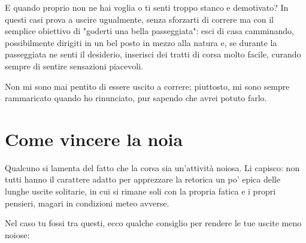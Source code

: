 E quando proprio non ne hai voglia o ti senti troppo stanco e demotivato?
In questi casi prova a uscire ugualmente,
senza sforzarti di correre
ma con il semplice obiettivo di "goderti una bella passeggiata":
esci di casa camminando, possibilmente dirigiti in un bel posto
in mezzo alla natura e, se durante la passeggiata ne senti il desiderio,
inserisci dei tratti di corsa molto facile,
curando sempre di sentire sensazioni piacevoli.

Non mi sono mai pentito di essere uscito a correre;
piuttosto, mi sono sempre rammaricato quando ho rinunciato,
pur sapendo che avrei potuto farlo.

\chapter{Come vincere la noia}

Qualcuno si lamenta del fatto che la corsa sia un'attività noiosa.
Li capisco: non tutti hanno il carattere adatto per apprezzare la
retorica un po' epica delle lunghe uscite solitarie, in cui si rimane
soli con la propria fatica e i propri pensieri,
magari in condizioni meteo avverse.

Nel caso tu fossi tra questi, ecco qualche consiglio
per rendere le tue uscite meno noiose:

